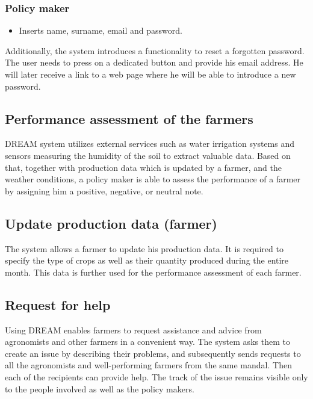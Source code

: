 \subsubsection*{Policy maker}

\begin{itemize}
    \item Inserts name, surname, email and password.
\end{itemize}

Additionally, the system introduces a functionality to reset a forgotten password. The user needs to press on a dedicated button and provide his email address. He will later receive a link to a web page where he will be able to introduce a new password. 

\subsection{Performance assessment of the farmers}

DREAM system utilizes external services such as water irrigation systems and sensors measuring the humidity of the soil to extract valuable data. Based on that, together with production data which is updated by a farmer, and the weather conditions, a policy maker is able to assess the performance of a farmer by assigning him a positive, negative, or neutral note.

\subsection{Update production data (farmer)}

The system allows a farmer to update his production data. It is required to specify the type of crops as well as their quantity produced during the entire month. This data is further used for the performance assessment of each farmer.

\subsection{Request for help}

Using DREAM enables farmers to request assistance and advice from agronomists and other farmers in a convenient way. The system asks them to create an issue by describing their problems, and subsequently sends  requests to all the agronomists and well-performing farmers from the same mandal. Then each of the recipients can provide help. The track of the issue remains visible only to the people involved as well as the policy makers.

